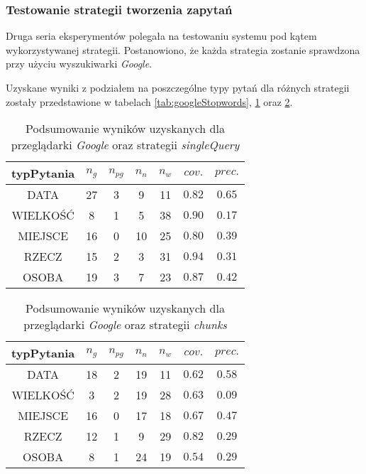 \subsubsection{Testowanie strategii tworzenia zapytań}
Druga seria eksperymentów polegała na testowaniu systemu pod kątem wykorzystywanej strategii. Postanowiono, że każda strategia zostanie sprawdzona przy użyciu wyszukiwarki \textit{Google}. 

Uzyskane wyniki z podziałem na poszczególne typy pytań dla różnych strategii zostały przedstawione w tabelach \ref{tab:googleStopwords}, \ref{tab:GoogleSingle} oraz \ref{tab:GoogleChunks}.

\begin{table}[h]
	\centering
	\begin{tabular}{|c|c|c|c|c|c|c| }
		
		\hline
		\textbf{typPytania} & $n_g$ &$n_{pg}$&$n_n$&$n_w$&$cov.$&$prec.$  \\ \hline
		DATA&27&3&9&11&$\num{0.82}$&$\num{0.65}$ \\ \hline
		WIELKOŚĆ&8&1&5&38&$\num{0.90}$&$\num{0.17}$ \\ \hline
		MIEJSCE&16&0&10&25&$\num{0.80}$&$\num{0.39}$ \\ \hline
		RZECZ&15&2&3&31&$\num{0.94}$&$\num{0.31}$\\ \hline
		OSOBA&19&3&7&23&$\num{0.87}$&$\num{0.42}$\\ \hline
	\end{tabular}
	\caption{Podsumowanie wyników uzyskanych dla przeglądarki \textit{Google} oraz strategii \textit{singleQuery}}
	
	\label{tab:GoogleSingle}
	
\end{table}

\begin{table}[h]
	\centering
	\begin{tabular}{|c|c|c|c|c|c|c| }
		
		\hline
		\textbf{typPytania} & $n_g$ &$n_{pg}$&$n_n$&$n_w$&$cov.$&$prec.$  \\ \hline
		DATA&18&2&19&11&$\num{0.62}$&$\num{0.58}$ \\ \hline
		WIELKOŚĆ&3&2&19&28&$\num{0.63}$&$\num{0.09}$ \\ \hline
		MIEJSCE&16&0&17&18&$\num{0.67}$&$\num{0.47}$ \\ \hline
		RZECZ&12&1&9&29&$\num{0.82}$&$\num{0.29}$\\ \hline
		OSOBA&8&1&24&19&$\num{0.54}$&$\num{0.29}$\\ \hline
	\end{tabular}
	\caption{Podsumowanie wyników uzyskanych dla przeglądarki \textit{Google} oraz strategii \textit{chunks}}
	
	\label{tab:GoogleChunks}
	
\end{table}

